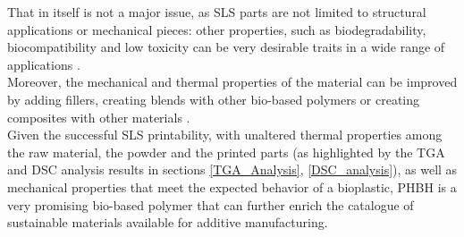 \documentclass{article}
\begin{document}
        That in itself is not a major issue, as SLS parts are not limited to structural applications or mechanical pieces:
        other properties, such as biodegradability, biocompatibility and low toxicity can be very desirable traits in a wide range of 
        applications \autocites{SLS_3dprinting_biomedical_polymers, Kovalcik_PHA_Review}. \\ 

        Moreover, the mechanical and thermal properties of the material can be improved by adding fillers, creating blends with other 
        bio-based polymers or creating composites with other materials \autocites{Recent_progress_polymers_AM,Eraslan_PHBH_review,PHBH_Crystallinity}. \\ 

        Given the successful SLS printability, with unaltered thermal properties among the raw material, the powder and the 
        printed parts (as highlighted by the TGA and DSC analysis results  in sections \ref{TGA_Analysis}, \ref{DSC_analysis}), as well as 
        mechanical properties that meet the expected behavior of a bioplastic, PHBH is a very promising bio-based polymer 
        that can further enrich the catalogue of sustainable materials available for additive manufacturing. \\ 
\end{document}
